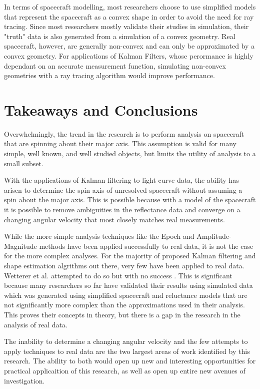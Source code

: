 \documentclass{article}
\begin{document}
In terms of spacecraft modelling, most researchers choose to use simplified models that represent the spacecraft as a convex shape in order to avoid the need for ray tracing. Since most researchers mostly validate their studies in simulation, their "truth" data is also generated from a simulation of a convex geometry. Real spacecraft, however, are generally non-convex and can only be approximated by a convex geometry. For applications of Kalman Filters, whose perormance is highly dependant on an accurate measurement function, simulating non-convex geometries with a ray tracing algorithm would improve performance.


\section{Takeaways and Conclusions}

Overwhelmingly, the trend in the research is to perform analysis on spacecraft that are spinning about their major axis. This assumption is valid for many simple, well known, and well studied objects, but limits the utility of analysis to a small subset.

With the applications of Kalman filtering to light curve data, the ability has arisen to determine the spin axis of unresolved spacecraft without assuming a spin about the major axis. This is possible because with a model of the spacecraft it is possible to remove ambiguities in the reflectance data and converge on a changing angular velocity that most closely matches real measurements.

While the more simple analysis techniques like the Epoch and Amplitude-Magnitude methods have been applied successfully to real data, it is not the case for the more complex analyses. For the majority of proposed Kalman filtering and shape estimation algrithms out there, very few have been applied to real data. Wetterer et al. attempted to do so but with no success \cite{AttitudeEstimationFromLightCurve}. This is significant because many researchers so far have validated their results using simulated data which was generated using simplified spacecraft and reluctance models that are not significantly more complex than the approximations used in their analysis. This proves their concepts in theory, but there is a gap in the research in the analysis of real data.

The inability to determine a changing angular velocity and the few attempts to apply techniques to real data are the two largest areas of work identified by this research. The ability to both would open up new and interesting opportunities for practical applicaition of this research, as well as open up entire new avenues of investigation.






\end{document}
